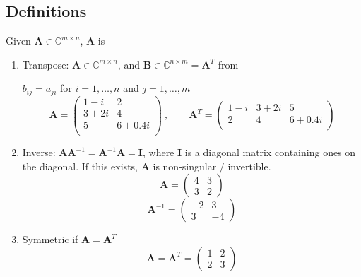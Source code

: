 \documentclass[12pt]{article}
\newcommand{\ve}[1]{\ensuremath{\mathbf{#1}}}
\begin{document}
\subsection*{Definitions}

Given $\ve{A} \in \mathbb{C}^{m \times n}$, \ve{A} is
%
\begin{enumerate}
\item Transpose: $\ve{A} \in \mathbb{C}^{m \times n}$, and $\ve{B} \in \mathbb{C}^{n \times m} = \ve{A}^T$ from

$b_{ij} = a_{ji}$ for $i = 1, \dots, n$ and $j = 1, \dots, m$
%
\newcommand{\aaa}{1-i}
\newcommand{\aab}{2}
\newcommand{\aba}{3+2i}
\newcommand{\abb}{4}
\newcommand{\aca}{5}
\newcommand{\acb}{6+0.4i}
%
\begin{equation}
\ve{A} = \begin{pmatrix}
   \aaa & \aab \\
   \aba & \abb \\
   \aca & \acb \\
\end{pmatrix}\:, \qquad 
%
\ve{A}^T = \begin{pmatrix}
   \aaa & \aba & \aca \\
   \aab & \abb & \acb \\
\end{pmatrix} \nonumber
\end{equation}

\item Inverse: $\ve{AA}^{-1} = \ve{A}^{-1}\ve{A} = \ve{I}$, where $\ve{I}$ is a diagonal matrix containing ones on the diagonal. If this exists, $\ve{A}$ is non-singular / invertible. 
\renewcommand{\aaa}{4}
\renewcommand{\aab}{3}
\renewcommand{\aba}{3}
\renewcommand{\abb}{2}
%
\begin{equation}
\ve{A} = \begin{pmatrix}
   \aaa & \aab \\
   \aba & \abb 
\end{pmatrix} \nonumber
\end{equation}
%
\renewcommand{\aaa}{-2}
\renewcommand{\abb}{-4}
%
\begin{equation}
\ve{A}^{-1} = \begin{pmatrix}
   \aaa & \aab \\
   \aba & \abb 
\end{pmatrix} \nonumber
\end{equation}


\item Symmetric if $\ve{A} = \ve{A}^T$
%
\renewcommand{\aaa}{1}
\renewcommand{\aab}{2}
\renewcommand{\aba}{2}
\renewcommand{\abb}{3}
%
\begin{equation}
\ve{A} = \ve{A}^T = \begin{pmatrix}
   \aaa & \aab \\
   \aba & \abb 
\end{pmatrix} \nonumber
\end{equation}


\end{enumerate}
\end{document}
